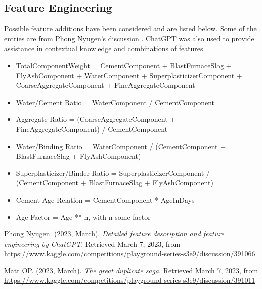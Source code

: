 \documentclass[onecolumn, 11pt]{article}
\begin{document}
\subsection*{Feature Engineering}
Possible feature additions have been considered and are listed below. Some of the entries are from Phong Nyugen's discussion \cite{feature_descriptions}. ChatGPT was also used to provide assistance in contextual knowledge and combinations of features. 
\begin{itemize}
  \item TotalComponentWeight = CementComponent + BlastFurnaceSlag + FlyAshComponent + WaterComponent + SuperplasticizerComponent + CoarseAggregateComponent + FineAggregateComponent
  \item Water/Cement Ratio = WaterComponent / CementComponent
  \item Aggregate Ratio = (CoarseAggregateComponent + FineAggregateComponent) / CementComponent
  \item Water/Binding Ratio = WaterComponent / (CementComponent + BlastFurnaceSlag + FlyAshComponent)
  \item Superplasticizer/Binder Ratio = SuperplasticizerComponent / (CementComponent + BlastFurnaceSlag + FlyAshComponent)
  \item Cement-Age Relation = CementComponent * AgeInDays
  \item Age Factor = Age ** n, with n some factor
 
\end{itemize}

\begin{thebibliography}{9}
  Phong Nyugen. (2023, March). \textit{Detailed feature description and feature engineering by ChatGPT}. 
  Retrieved March 7, 2023, 
  from \url{https://www.kaggle.com/competitions/playground-series-s3e9/discussion/391066}

  Matt OP. (2023, March). \textit{The great duplicate saga}. 
  Retrieved March 7, 2023, 
  from \url{https://www.kaggle.com/competitions/playground-series-s3e9/discussion/391011}

\end{thebibliography}
\end{document}
